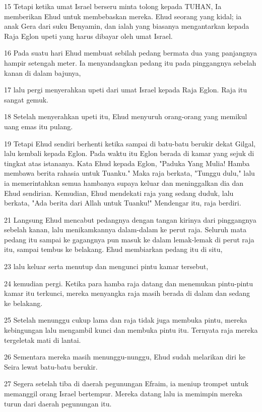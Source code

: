 \par 15 Tetapi ketika umat Israel berseru minta tolong kepada TUHAN, Ia memberikan Ehud untuk membebaskan mereka. Ehud seorang yang kidal; ia anak Gera dari suku Benyamin, dan ialah yang biasanya mengantarkan kepada Raja Eglon upeti yang harus dibayar oleh umat Israel.
\par 16 Pada suatu hari Ehud membuat sebilah pedang bermata dua yang panjangnya hampir setengah meter. Ia menyandangkan pedang itu pada pinggangnya sebelah kanan di dalam bajunya,
\par 17 lalu pergi menyerahkan upeti dari umat Israel kepada Raja Eglon. Raja itu sangat gemuk.
\par 18 Setelah menyerahkan upeti itu, Ehud menyuruh orang-orang yang memikul uang emas itu pulang.
\par 19 Tetapi Ehud sendiri berhenti ketika sampai di batu-batu berukir dekat Gilgal, lalu kembali kepada Eglon. Pada waktu itu Eglon berada di kamar yang sejuk di tingkat atas istananya. Kata Ehud kepada Eglon, "Paduka Yang Mulia! Hamba membawa berita rahasia untuk Tuanku." Maka raja berkata, "Tunggu dulu," lalu ia memerintahkan semua hambanya supaya keluar dan meninggalkan dia dan Ehud sendirian. Kemudian, Ehud mendekati raja yang sedang duduk, lalu berkata, "Ada berita dari Allah untuk Tuanku!" Mendengar itu, raja berdiri.
\par 21 Langsung Ehud mencabut pedangnya dengan tangan kirinya dari pinggangnya sebelah kanan, lalu menikamkannya dalam-dalam ke perut raja. Seluruh mata pedang itu sampai ke gagangnya pun masuk ke dalam lemak-lemak di perut raja itu, sampai tembus ke belakang. Ehud membiarkan pedang itu di situ,
\par 23 lalu keluar serta menutup dan mengunci pintu kamar tersebut,
\par 24 kemudian pergi. Ketika para hamba raja datang dan menemukan pintu-pintu kamar itu terkunci, mereka menyangka raja masih berada di dalam dan sedang ke belakang.
\par 25 Setelah menunggu cukup lama dan raja tidak juga membuka pintu, mereka kebingungan lalu mengambil kunci dan membuka pintu itu. Ternyata raja mereka tergeletak mati di lantai.
\par 26 Sementara mereka masih menunggu-nunggu, Ehud sudah melarikan diri ke Seira lewat batu-batu berukir.
\par 27 Segera setelah tiba di daerah pegunungan Efraim, ia meniup trompet untuk memanggil orang Israel bertempur. Mereka datang lalu ia memimpin mereka turun dari daerah pegunungan itu.
